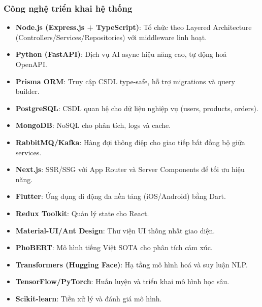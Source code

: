 \subsubsection{Công nghệ triển khai hệ thống}
\begin{itemize}
    \item \textbf{Node.js (Express.js + TypeScript)}: Tổ chức theo Layered Architecture (Controllers/Services/Repositories) với middleware linh hoạt.
    \item \textbf{Python (FastAPI)}: Dịch vụ AI async hiệu năng cao, tự động hoá OpenAPI.
    \item \textbf{Prisma ORM}: Truy cập CSDL type-safe, hỗ trợ migrations và query builder.
    \item \textbf{PostgreSQL}: CSDL quan hệ cho dữ liệu nghiệp vụ (users, products, orders).
    \item \textbf{MongoDB}: NoSQL cho phân tích, logs và cache.
    \item \textbf{RabbitMQ/Kafka}: Hàng đợi thông điệp cho giao tiếp bất đồng bộ giữa services.
\end{itemize}

\begin{itemize}
    \item \textbf{Next.js}: SSR/SSG với App Router và Server Components để tối ưu hiệu năng.
    \item \textbf{Flutter}: Ứng dụng di động đa nền tảng (iOS/Android) bằng Dart.
    \item \textbf{Redux Toolkit}: Quản lý state cho React.
    \item \textbf{Material-UI/Ant Design}: Thư viện UI thống nhất giao diện.
\end{itemize}

\begin{itemize}
    \item \textbf{PhoBERT}: Mô hình tiếng Việt SOTA cho phân tích cảm xúc.
    \item \textbf{Transformers (Hugging Face)}: Hạ tầng mô hình hoá và suy luận NLP.
    \item \textbf{TensorFlow/PyTorch}: Huấn luyện và triển khai mô hình học sâu.
    \item \textbf{Scikit-learn}: Tiền xử lý và đánh giá mô hình.
\end{itemize}

